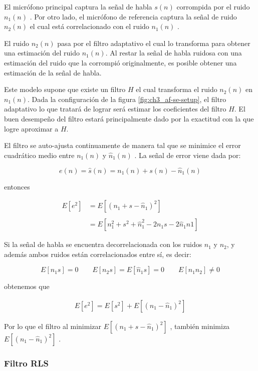 El micrófono principal captura la señal de habla $s(n)$ corrompida por el ruido $n_1(n)$ . Por otro lado, el micrófono de referencia captura la señal de ruido $n_2(n)$ el cual está correlacionado con el ruido $n_1(n)$ . 

El ruido $n_2(n)$ pasa por el filtro adaptativo el cual lo transforma para obtener una estimación del ruido $n_1(n)$. Al restar la señal de habla ruidosa con una estimación del ruido que la corrompió originalmente, es posible obtener una estimación de la señal de habla. 

Este modelo supone que existe un filtro $H$ el cual transforma el ruido $n_2(n)$ en $n_1(n)$. Dada la configuración de la figura \ref{fig:ch3_af-se-setup}, el filtro adaptativo lo que tratará de lograr será estimar los coeficientes del filtro $H$. El buen desempeño del filtro estará principalmente dado por la exactitud con la que logre aproximar a $H$.

El filtro se auto-ajusta continuamente de manera tal que se minimice el error cuadrático medio entre $n_1(n)$ y $\hat{n}_1(n)$ . La señal de error viene dada por:

\begin{equation*}
	e(n) = \hat{s}(n) = n_1(n) + s(n) - \hat{n}_1(n)
\end{equation*}

entonces

\begin{align*}
	E[e^2] &= E[( n_1 + s - \hat{n}_1)^2] \\ \\
	&= E[n_1^2 + s^2 + \hat{n}_1^2 - 2 n_1 s - 2 \hat{n}_1 n1]
\end{align*}

Si la señal de habla se encuentra decorrelacionada con los ruidos $n_1$ y $n_2$, y además ambos ruidos están correlacionados entre sí, es decir:

\begin{equation*}
	E[n_1 s] = 0 \qquad E[n_2 s] = E[\hat{n}_1 s] = 0 \qquad E[n_1 n_2] \neq 0
\end{equation*}

obtenemos que

\begin{align*}
	E[e^2] = E[s^2] + E[(n_1 - \hat{n}_1)^2]
\end{align*}

Por lo que el filtro al minimizar $E[( n_1 + s - \hat{n}_1)^2]$ , también minimiza $E[(n_1 - \hat{n}_1)^2]$ .


\subsubsection{Filtro RLS}
\label{sec:adaptive_filter_rls}

